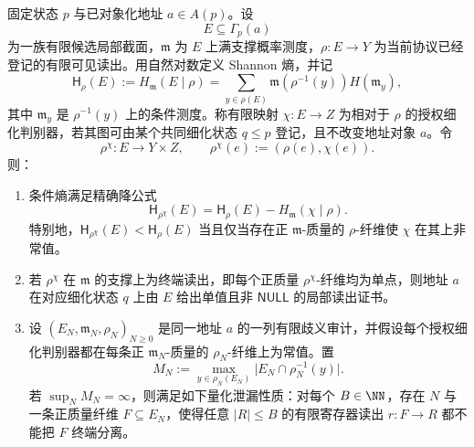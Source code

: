 \begin{theorem}[地址歧义的条件熵降与无界寄存器泄漏]\label{distill:bourgain-entropy_increment_closure-address-ambiguity-entropy-leak}
固定状态 \(p\) 与已对象化地址 \(a\in A(p)\)。设
\[
E\subseteq \Gamma_p(a)
\]
为一族有限候选局部截面，\(\mathfrak m\) 为 \(E\) 上满支撑概率测度，\(\rho:E\to Y\) 为当前协议已经登记的有限可见读出。用自然对数定义 Shannon 熵，并记
\[
\mathsf H_\rho(E):=H_{\mathfrak m}(E\mid \rho)
=
\sum_{y\in\rho(E)}\mathfrak m(\rho^{-1}(y))H(\mathfrak m_y),
\]
其中 \(\mathfrak m_y\) 是 \(\rho^{-1}(y)\) 上的条件测度。称有限映射 \(\chi:E\to Z\) 为相对于 \(\rho\) 的授权细化判别器，若其图可由某个共同细化状态 \(q\le p\) 登记，且不改变地址对象 \(a\)。令
\[
\rho^\chi:E\longrightarrow Y\times Z,
\qquad
\rho^\chi(e):=(\rho(e),\chi(e)).
\]
则：
\begin{enumerate}
  \item 条件熵满足精确降公式
  \[
  \mathsf H_{\rho^\chi}(E)
  =\mathsf H_\rho(E)-H_{\mathfrak m}(\chi\mid \rho).
  \]
  特别地，\(\mathsf H_{\rho^\chi}(E)<\mathsf H_\rho(E)\) 当且仅当存在正 \(\mathfrak m\)-质量的 \(\rho\)-纤维使 \(\chi\) 在其上非常值。
  \item 若 \(\rho^\chi\) 在 \(\mathfrak m\) 的支撑上为终端读出，即每个正质量 \(\rho^\chi\)-纤维均为单点，则地址 \(a\) 在对应细化状态 \(q\) 上由 \(E\) 给出单值且非 \(\mathsf{NULL}\) 的局部读出证书。
  \item 设 \((E_N,\mathfrak m_N,\rho_N)_{N\ge0}\) 是同一地址 \(a\) 的一列有限歧义审计，并假设每个授权细化判别器都在每条正 \(\mathfrak m_N\)-质量的 \(\rho_N\)-纤维上为常值。置
  \[
  M_N:=\max_{y\in\rho_N(E_N)}\bigl|E_N\cap\rho_N^{-1}(y)\bigr|.
  \]
  若 \(\sup_N M_N=\infty\)，则满足如下量化泄漏性质：对每个 \(B\in\NN\)，存在 \(N\) 与一条正质量纤维 \(F\subseteq E_N\)，使得任意 \(|R|\le B\) 的有限寄存器读出 \(r:F\to R\) 都不能把 \(F\) 终端分离。
\end{enumerate}
\end{theorem}

